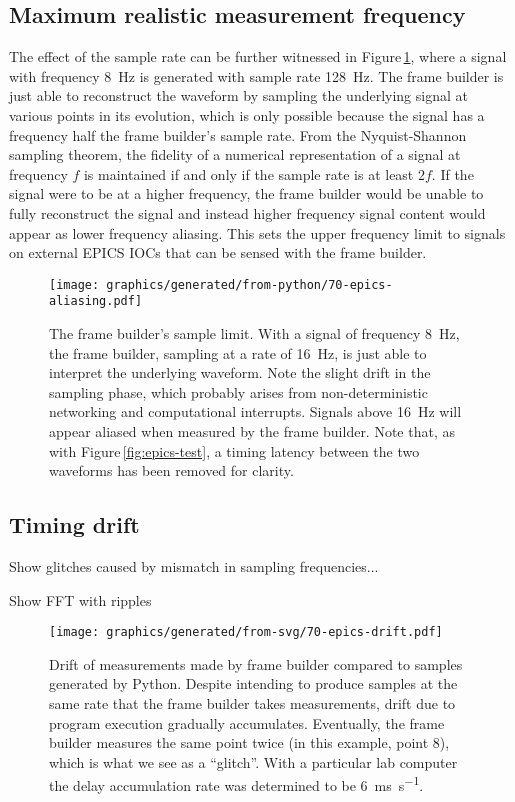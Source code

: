 \subsection{Maximum realistic measurement frequency}
The effect of the sample rate can be further witnessed in Figure\,\ref{fig:sample-aliasing}, where a signal with frequency \SI{8}{\hertz} is generated with sample rate \SI{128}{\hertz}. The frame builder is just able to reconstruct the waveform by sampling the underlying signal at various points in its evolution, which is only possible because the signal has a frequency half the frame builder's sample rate. From the Nyquist-Shannon sampling theorem, the fidelity of a numerical representation of a signal at frequency $f$ is maintained if and only if the sample rate is at least $2f$. If the signal were to be at a higher frequency, the frame builder would be unable to fully reconstruct the signal and instead higher frequency signal content would appear as lower frequency aliasing. This sets the upper frequency limit to signals on external \gls{EPICS} \glspl{IOC} that can be sensed with the frame builder.

\begin{figure}
  \centering
  \texttt{[image: graphics/generated/from-python/70-epics-aliasing.pdf]}
  \caption{\label{fig:sample-aliasing}The frame builder's sample limit. With a signal of frequency \SI{8}{\hertz}, the frame builder, sampling at a rate of \SI{16}{\hertz}, is just able to interpret the underlying waveform. Note the slight drift in the sampling phase, which probably arises from non-deterministic networking and computational interrupts. Signals above \SI{16}{\hertz} will appear aliased when measured by the frame builder. Note that, as with Figure\,\ref{fig:epics-test}, a timing latency between the two waveforms has been removed for clarity.}
\end{figure}

\subsection{Timing drift}
Show glitches caused by mismatch in sampling frequencies...

Show FFT with ripples

\begin{figure}
  \centering
  \texttt{[image: graphics/generated/from-svg/70-epics-drift.pdf]}
  \caption{\label{fig:epics-drift}Drift of measurements made by frame builder compared to samples generated by Python. Despite intending to produce samples at the same rate that the frame builder takes measurements, drift due to program execution gradually accumulates. Eventually, the frame builder measures the same point twice (in this example, point 8), which is what we see as a ``glitch''. With a particular lab computer the delay accumulation rate was determined to be \SI{6}{\milli\second\per\second}.}
\end{figure}

